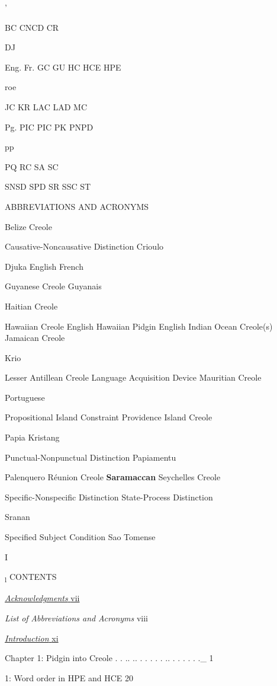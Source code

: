 '

BC CNCD CR

DJ

Eng. Fr. GC GU HC HCE HPE

roe

JC KR LAC LAD MC

Pg. PIC PIC PK PNPD

pp

PQ RC SA SC

SNSD SPD SR SSC ST

ABBREVIATIONS AND ACRONYMS

Belize Creole

Causative-Noncausative Distinction Crioulo

Djuka English French

Guyanese Creole Guyanais

Haitian Creole

Hawaiian Creole English Hawaiian Pidgin English Indian Ocean Creole(s) Jamaican Creole

Krio

Lesser Antillean Creole Language Acquisition Device Mauritian Creole

Portuguese

Propositional Island Constraint Providence Island Creole

Papia Kristang

Punctual-Nonpunctual Distinction Papiamentu

Palenquero Réunion Creole \textbf{Saramaccan} Seychelles Creole

Specific-Nonspecific Distinction State-Process Distinction

Sranan

Specified Subject Condition Sao Tomense

I

\textsubscript{l }CONTENTS 

\hyperlink{TOC250001}{\textit{Acknowledgments}}\hyperlink{TOC250001}{ }\hyperlink{TOC250001}{vii}

\textit{List}\textit{ }\textit{of}\textit{ }\textit{Abbreviations and}\textit{ }\textit{Acronyms} viii

\hyperlink{TOC250000}{\textit{Introduction}}\hyperlink{TOC250000}{ }\hyperlink{TOC250000}{xi}

Chapter 1: Pidgin into Creole . . .. .. . . . . . .. . . . . . .\_ 1

\begin{table}
\caption{1: Word order in HPE and HCE 20}
\label{tab:1}
\end{table}

